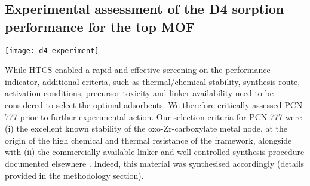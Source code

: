 \subsection{Experimental assessment of the D4 sorption performance for the top MOF}\label{assessment}

\begin{widefigure}[htb]
    \centering
    \texttt{[image: d4-experiment]}
    \caption{%
        (a) Single component adsorption/desorption isotherms for D4 (blue) and
         (red) collected at \SI{303}{\kelvin} for PCN-777 in the
        pressure range of 0-\SI{10}{\pascal} (corresponding to 0--0.05
        p/p\textsuperscript{0} for D4). Solid and open symbols represent
        adsorption and desorption branches, respectively. (b) Comparison of the
        D4 capacity of MOFs investigated in the present study with other classes
        of porous materials (data from
        \citet{wangRecentAdvancesTechnologies2019}), with error bars placed at
        one standard deviation of mean capacity. (c) 5 D4 sorption-desorption
        cycles recorded after the first two isotherms on PCN-777, in the same
        pressure range. (d) PXRD of pristine PCN-777 sample (black) and samples
        recovered after D4 cycling (blue) and water adsorption (red).
    }\label{fig:d4-experiment}
\end{widefigure}

While HTCS enabled a rapid and effective screening on the performance indicator,
additional criteria, such as thermal/chemical stability, synthesis route,
activation conditions, precursor toxicity and linker availability need to be
considered to select the optimal adsorbents. We therefore critically assessed
PCN-777 prior to further experimental action. Our selection criteria for PCN-777
were (i) the excellent known stability of the oxo-Zr-carboxylate metal node, at
the origin of the high chemical and thermal resistance of the framework,
alongside with (ii) the commercially available linker and well-controlled
synthesis procedure documented elsewhere \citep{fengHighlyStableZeotype2015,
liuPhotocatalyticHydrogenProduction2018}. Indeed, this material was synthesised
accordingly (details provided in the methodology section).

